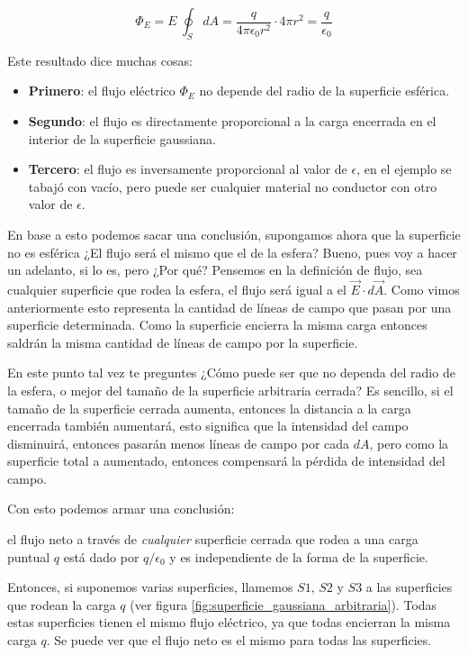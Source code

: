 \[
\Phi_E = E ~ \oint_S dA = \frac{q}{4\pi \epsilon_0 r^2} \cdot 4\pi r^2 = \boxed{\frac{q}{\epsilon_0}}
\]

Este resultado dice muchas cosas:
\begin{itemize}
    \item \textbf{Primero}: el flujo eléctrico \(\Phi_E\) no depende del radio de la superficie esférica.
    \item \textbf{Segundo}: el flujo es directamente proporcional a la carga encerrada en el interior de la superficie gaussiana.
    \item \textbf{Tercero}: el flujo es inversamente proporcional al valor de \(\epsilon\), en el ejemplo se tabajó con vacío, pero puede ser cualquier material no conductor con otro valor de \(\epsilon\).
\end{itemize}

En base a esto podemos sacar una conclusión, supongamos ahora que la superficie no es esférica ¿El flujo será el mismo que el de la esfera? Bueno, pues voy a hacer un adelanto, si lo es, pero ¿Por qué? Pensemos en la definición de flujo, sea cualquier superficie que rodea la esfera, el flujo será igual a el \(\vec{E}\cdot d\vec{A}\). Como vimos anteriormente esto representa la cantidad de líneas de campo que pasan por una superficie determinada. Como la superficie encierra la misma carga entonces saldrán la misma cantidad de líneas de campo por la superficie.

En este punto tal vez te preguntes ¿Cómo puede ser que no dependa del radio de la esfera, o mejor del tamaño de la superficie arbitraria cerrada? Es sencillo, si el tamaño de la superficie cerrada aumenta, entonces la distancia a la carga encerrada también aumentará, esto significa que la intensidad del campo disminuirá, entonces pasarán menos líneas de campo por cada \(dA\), pero como la superficie total a aumentado, entonces compensará la pérdida de intensidad del campo.

Con esto podemos armar una conclusión:

\begin{tcolorbox}[myconclusion]
    el flujo neto a través de \textit{cualquier} superficie cerrada que rodea a una carga puntual \(q\) está dado por \(q/\epsilon_0\) y es independiente de la forma de la superficie.
\end{tcolorbox}

Entonces, si suponemos varias superficies, llamemos \(S1\), \(S2\) y \(S3\) a las superficies que rodean la carga \(q\) (ver figura \ref{fig:superficie_gaussiana_arbitraria}). Todas estas superficies tienen el mismo flujo eléctrico, ya que todas encierran la misma carga \(q\). Se puede ver que el flujo neto es el mismo para todas las superficies.


